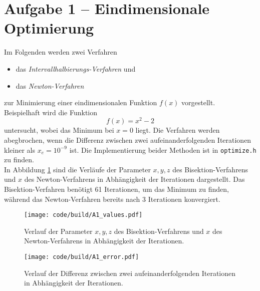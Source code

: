 \section{Aufgabe 1 – Eindimensionale Optimierung}
\label{sec:A1}
Im Folgenden werden zwei Verfahren
\begin{itemize}
    \item das \textit{Intervallhalbierungs-Verfahren} und
    \item das \textit{Newton-Verfahren}
\end{itemize}
zur Minimierung einer eindimensionalen Funktion $f(x)$ vorgestellt.
\\
Beispielhaft wird die Funktion
\begin{equation}
  f(x) = x^2 - 2
\end{equation}
untersucht, wobei das Minimum bei $x=0$ liegt.
Die Verfahren werden abegbrochen, wenn die Differenz zwischen zwei aufeinanderfolgenden Iterationen kleiner als $x_e = 10^{-9}$ ist.
Die Implementierung beider Methoden ist in \texttt{optimize.h} zu finden.
\\
In Abbildung \ref{fig:A1_values} sind die Verläufe der Parameter $x, y, z$ des Bisektion-Verfahrens und $x$ des Newton-Verfahrens in Abhängigkeit der Iterationen dargestellt.
Das Bisektion-Verfahren benötigt 61 Iterationen, um das Minimum zu finden, während das Newton-Verfahren bereits nach 3 Iterationen konvergiert.
\begin{figure}
    \centering
    \texttt{[image: code/build/A1\_values.pdf]}
    \caption{Verlauf der Parameter $x, y, z$ des Bisektion-Verfahrens und $x$ des Newton-Verfahrens in Abhängigkeit der Iterationen.}
    \label{fig:A1_values}
\end{figure}

\begin{figure}
    \centering
    \texttt{[image: code/build/A1\_error.pdf]}
    \caption{Verlauf der Differenz zwischen zwei aufeinanderfolgenden Iterationen in Abhängigkeit der Iterationen.}
    \label{fig:A1_error}
\end{figure}
\FloatBarrier